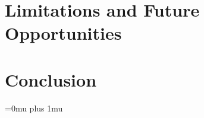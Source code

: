 \documentclass[journal]{IEEEtran}
\begin{document}
\section{Limitations and Future Opportunities}
\label{sec_future}


\section{Conclusion}
\label{sec_conclusion}


% 

% 



\Urlmuskip=0mu plus 1mu\relax



% 
\end{document}
